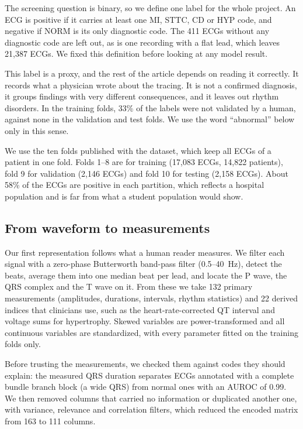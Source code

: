 \documentclass[letterpaper,11pt]{article}
\begin{document}
The screening question is binary, so we define one label for the whole project. An ECG is positive if it carries at least one MI, STTC, CD or HYP code, and negative if NORM is its only diagnostic code. The 411 ECGs without any diagnostic code are left out, as is one recording with a flat lead, which leaves 21,387 ECGs. We fixed this definition before looking at any model result.

This label is a proxy, and the rest of the article depends on reading it correctly. It records what a physician wrote about the tracing. It is not a confirmed diagnosis, it groups findings with very different consequences, and it leaves out rhythm disorders. In the training folds, 33\% of the labels were not validated by a human, against none in the validation and test folds. We use the word ``abnormal'' below only in this sense.

We use the ten folds published with the dataset, which keep all ECGs of a patient in one fold. Folds 1--8 are for training (17,083 ECGs, 14,822 patients), fold 9 for validation (2,146 ECGs) and fold 10 for testing (2,158 ECGs). About 58\% of the ECGs are positive in each partition, which reflects a hospital population and is far from what a student population would show.

\subsection{From waveform to measurements}

Our first representation follows what a human reader measures. We filter each signal with a zero-phase Butterworth band-pass filter (0.5--40~Hz), detect the beats, average them into one median beat per lead, and locate the P wave, the QRS complex and the T wave on it. From these we take 132 primary measurements (amplitudes, durations, intervals, rhythm statistics) and 22 derived indices that clinicians use, such as the heart-rate-corrected QT interval and voltage sums for hypertrophy. Skewed variables are power-transformed and all continuous variables are standardized, with every parameter fitted on the training folds only.

Before trusting the measurements, we checked them against codes they should explain: the measured QRS duration separates ECGs annotated with a complete bundle branch block (a wide QRS) from normal ones with an AUROC of 0.99. We then removed columns that carried no information or duplicated another one, with variance, relevance and correlation filters, which reduced the encoded matrix from 163 to 111 columns.
\end{document}
